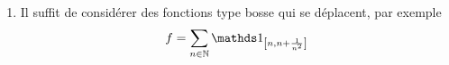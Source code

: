 {\begin{nntd-sol}[]
\begin{enumerate}
            On pose maintenant \(x=\lambda_1\left(\ff{0,x}\right)=\int_{\ff{0,x}}1\der\lambda_1\). Alors
            \begin{equation*}
                \begin{aligned}
                    \int_{\R_+}f(x)\one_{\fo{0,x}}\der\lambda_1
                    &\geq \int f(x)\one_{\fo{0,x}}\der\lambda_1 \\
                    &\geq f(x)\int \one_{\fo{0,x}}\der\lambda_1 \\
                    &\geq f(x) x
                \end{aligned}
            \end{equation*}
            Enfin on a
            \begin{equation*}
                \frac{\overbrace{\int_{\R_+}f\der\lambda_1}^{\in\R}}{x}\geq f(x)\quad \forall x\in\R_+
            \end{equation*}

            \item Il suffit de considérer des fonctions type bosse qui se déplacent,
            par exemple
            \begin{equation*}
                f=\sum_{n\in\N}\one_{\ff{n,n+\frac{1}{n^2}}}
            \end{equation*}
        \end{enumerate}
    \end{nntd-sol}
}{}

